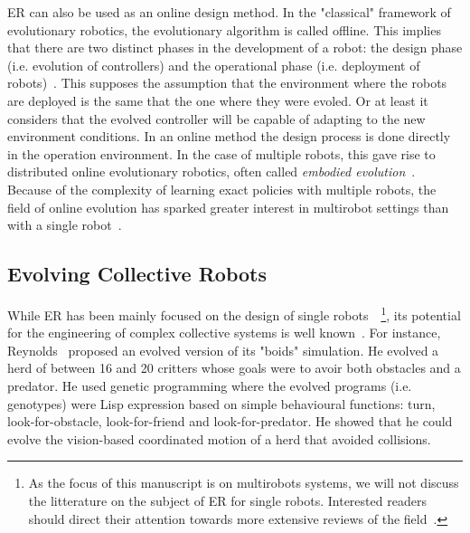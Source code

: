     ER can also be used as an online design method. In the "classical" framework of evolutionary robotics, the evolutionary algorithm is called offline. This implies that there are two distinct phases in the development of a robot: the design phase (i.e. evolution of controllers) and the operational phase (i.e. deployment of robots)~\parencite{Doncieux2015a, Francesca2016}. This supposes the assumption that the environment where the robots are deployed is the same that the one where they were evoled. Or at least it considers that the evolved controller will be capable of adapting to the new environment conditions. In an online method the design process is done directly in the operation environment. In the case of multiple robots, this gave rise to distributed online evolutionary robotics, often called \emph{embodied evolution}~\parencite{Ficici1999, Watson2002}. Because of the complexity of learning exact policies with multiple robots, the field of online evolution has sparked greater interest in multirobot settings than with a single robot~\parencite{Doncieux2015a}.


  \subsection{Evolving Collective Robots}

    While ER has been mainly focused on the design of single robots~\parencite{Doncieux2015a}~\footnote{As the focus of this manuscript is on multirobots systems, we will not discuss the litterature on the subject of ER for single robots. Interested readers should direct their attention towards more extensive reviews of the field~\parencite{Floreano2008, Bongard2013a, Trianni2014, Doncieux2015a}.}, its potential for the engineering of complex collective systems is well known~\parencite{Baldassarre2003}. For instance, Reynolds~\parencite{Reynolds1992} proposed an evolved version of its "boids" simulation. He evolved a herd of between 16 and 20 critters whose goals were to avoir both obstacles and a predator. He used genetic programming where the evolved programs (i.e. genotypes) were Lisp expression based on simple behavioural functions: turn, look-for-obstacle, look-for-friend and look-for-predator. He showed that he could evolve the vision-based coordinated motion of a herd that avoided collisions.

